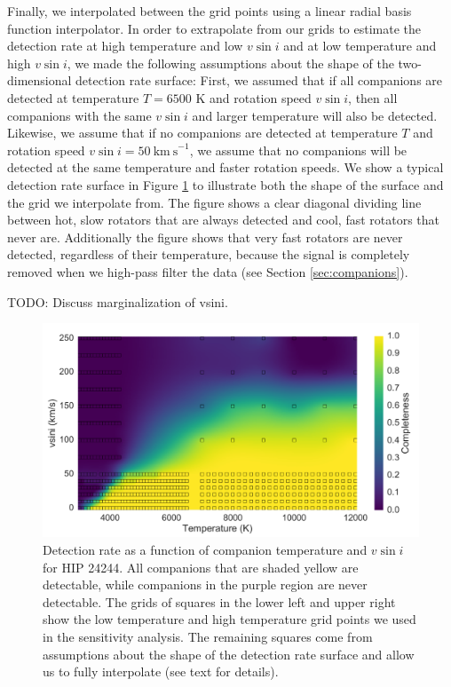 \documentclass{emulateapj}
\begin{document}
Finally, we interpolated between the grid points using a linear radial basis function interpolator. In order to extrapolate from our grids to estimate the detection rate at high temperature and low $v\sin{i}$ and at low temperature and high $v\sin{i}$, we made the following assumptions about the shape of the two-dimensional detection rate surface: First, we assumed that if all companions are detected at temperature $T=6500$ K and rotation speed $v\sin{i}$, then all companions with the same $v\sin{i}$ and larger temperature will also be detected. Likewise, we assume that if no companions are detected at temperature $T$ and rotation speed $v\sin{i} = 50\ \mathrm{km\ s}^{-1}$, we assume that no companions will be detected at the same temperature and faster rotation speeds. We show a typical detection rate surface in Figure \ref{fig:detrate_2d} to illustrate both the shape of the surface and the grid we interpolate from. The figure shows a clear diagonal dividing line between hot, slow rotators that are always detected and cool, fast rotators that never are. Additionally the figure shows that very fast rotators are never detected, regardless of their temperature, because the signal is completely removed when we high-pass filter the data (see Section \ref{sec:companions}).

TODO: Discuss marginalization of vsini.


\begin{figure}
\includegraphics[width=\columnwidth]{HIP_24244_20130919.pdf}
\caption{Detection rate as a function of companion temperature and $v\sin{i}$ for HIP 24244. All companions that are shaded yellow are detectable, while companions in the purple region are never detectable. The grids of squares in the lower left and upper right show the low temperature and high temperature grid points we used in the sensitivity analysis. The remaining squares come from assumptions about the shape of the detection rate surface and allow us to fully interpolate (see text for details).}
\label{fig:detrate_2d}
\end{figure}
\end{document}
